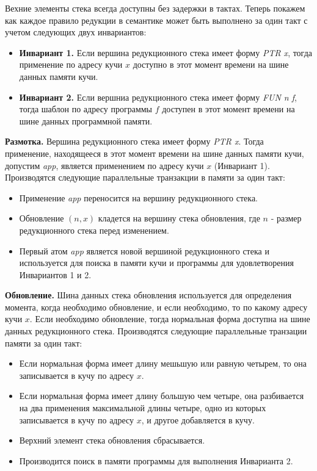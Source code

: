 \documentclass[flenqn, 14pt]{extarticle}
\begin{document}
Вехние элементы стека всегда доступны без задержки в тактах. Теперь покажем как каждое правило редукции в семантике может быть выполнено за один такт с учетом следующих двух инвариантов:
\begin{itemize}
\item \textbf{Инвариант 1.} Если вершина редукционного стека имеет форму \textit{PTR x}, тогда применение по адресу кучи $x$ доступно в этот момент времени на шине данных памяти кучи.
\item \textbf{Инвариант 2.} Если вершниа редукционного стека имеет форму \textit{FUN n f}, тогда шаблон по адресу программы $f$ доступен в этот момент времени на шине данных программной памяти.
\end{itemize}

\textbf{Размотка.} Вершина редукционного стека имеет форму \textit{PTR x}. Тогда применение, находящееся в этот момент времени на шине данных памяти кучи, допустим \textit{app}, является применением по адресу кучи $x$ (Инвариант 1). Производятся следующие параллельные транзакции в памяти за один такт:
\begin{itemize}
\item Применение \textit{app} переносится на вершину редукционного стека.
\item Обновление $(n,x)$ кладется на вершину стека обновления, где $n$ - размер редукционного стека перед изменением.
\item Первый атом \textit{app} является новой вершиной редукционного стека и используется для поиска в памяти кучи и программы для удовлетворения Инвариантов 1 и 2.
\end{itemize}

\textbf{Обновление.} Шина данных стека обновления используется для определения момента, когда необходимо обновление, и если необходимо, то по какому адресу кучи $x$. Если необходимо обновление, тогда нормальная форма доступна на шине данных редукционного стека. Производятся следующие параллельные транзации памяти за один такт:
\begin{itemize}
\item Если нормальная форма имеет длину мешьшую или равную четырем, то она записывается в кучу по адресу $x$.
\item Если нормальная форма имеет длину большую чем четыре, она разбивается на два применения максимальной длины четыре, одно из которых записывается в кучу по адресу $x$, и другое добавляется в кучу.
\item Верхний элемент стека обновления сбрасывается.
\item Производится поиск в памяти программы для выполнения Инварианта 2.
\end{itemize}
\end{document}
